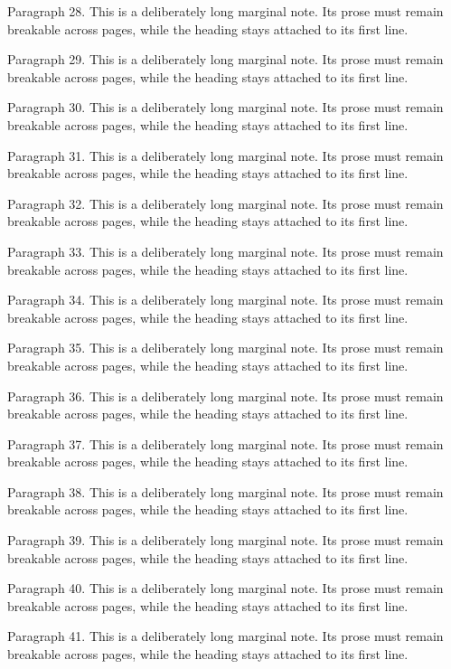 \documentclass[11pt]{article}
\begin{document}
{Paragraph 28. This is a deliberately long marginal note. Its prose must remain breakable across pages, while the heading stays attached to its first line.\par
Paragraph 29. This is a deliberately long marginal note. Its prose must remain breakable across pages, while the heading stays attached to its first line.\par
Paragraph 30. This is a deliberately long marginal note. Its prose must remain breakable across pages, while the heading stays attached to its first line.\par
Paragraph 31. This is a deliberately long marginal note. Its prose must remain breakable across pages, while the heading stays attached to its first line.\par
Paragraph 32. This is a deliberately long marginal note. Its prose must remain breakable across pages, while the heading stays attached to its first line.\par
Paragraph 33. This is a deliberately long marginal note. Its prose must remain breakable across pages, while the heading stays attached to its first line.\par
Paragraph 34. This is a deliberately long marginal note. Its prose must remain breakable across pages, while the heading stays attached to its first line.\par
Paragraph 35. This is a deliberately long marginal note. Its prose must remain breakable across pages, while the heading stays attached to its first line.\par
Paragraph 36. This is a deliberately long marginal note. Its prose must remain breakable across pages, while the heading stays attached to its first line.\par
Paragraph 37. This is a deliberately long marginal note. Its prose must remain breakable across pages, while the heading stays attached to its first line.\par
Paragraph 38. This is a deliberately long marginal note. Its prose must remain breakable across pages, while the heading stays attached to its first line.\par
Paragraph 39. This is a deliberately long marginal note. Its prose must remain breakable across pages, while the heading stays attached to its first line.\par
Paragraph 40. This is a deliberately long marginal note. Its prose must remain breakable across pages, while the heading stays attached to its first line.\par
Paragraph 41. This is a deliberately long marginal note. Its prose must remain breakable across pages, while the heading stays attached to its first line.\par
}
\end{document}
